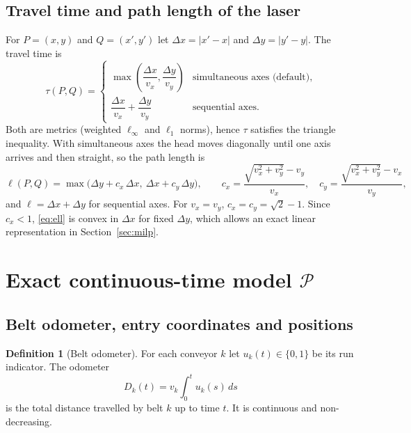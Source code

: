 \documentclass[11pt,a4paper]{article}
\theoremstyle{definition}
\newtheorem{definition}{Definition}
\theoremstyle{remark}
\newcommand{\Pb}{\mathcal{P}}
\begin{document}
\subsection{Travel time and path length of the laser}
For $P=(x,y)$ and $Q=(x',y')$ let $\Delta x=|x'-x|$ and $\Delta y=|y'-y|$. The travel
time is
\begin{equation}\label{eq:tau}
\tau(P,Q)=
\begin{cases}
\max\!\left(\dfrac{\Delta x}{v_x},\dfrac{\Delta y}{v_y}\right) & \text{simultaneous axes (default)},\\[2ex]
\dfrac{\Delta x}{v_x}+\dfrac{\Delta y}{v_y} & \text{sequential axes}.
\end{cases}
\end{equation}
Both are metrics (weighted $\ell_\infty$ and $\ell_1$ norms), hence $\tau$ satisfies the
triangle inequality. With simultaneous axes the head moves diagonally until one axis
arrives and then straight, so the path length is
\begin{equation}\label{eq:ell}
\ell(P,Q)=\max\bigl(\Delta y+c_x\,\Delta x,\ \Delta x+c_y\,\Delta y\bigr),\qquad
c_x=\frac{\sqrt{v_x^2+v_y^2}-v_y}{v_x},\quad c_y=\frac{\sqrt{v_x^2+v_y^2}-v_x}{v_y},
\end{equation}
and $\ell=\Delta x+\Delta y$ for sequential axes. For $v_x=v_y$,
$c_x=c_y=\sqrt2-1$. Since $c_x<1$, \eqref{eq:ell} is convex in $\Delta x$ for fixed
$\Delta y$, which allows an exact linear representation in Section~\ref{sec:milp}.

\section{Exact continuous-time model \texorpdfstring{$\Pb$}{P}}

\subsection{Belt odometer, entry coordinates and positions}

\begin{definition}[Belt odometer]
For each conveyor $k$ let $u_k(t)\in\{0,1\}$ be its run indicator. The odometer
\[
D_k(t)=v_k\int_0^t u_k(s)\,ds
\]
is the total distance travelled by belt $k$ up to time $t$. It is continuous and
non-decreasing.
\end{definition}
\end{document}
